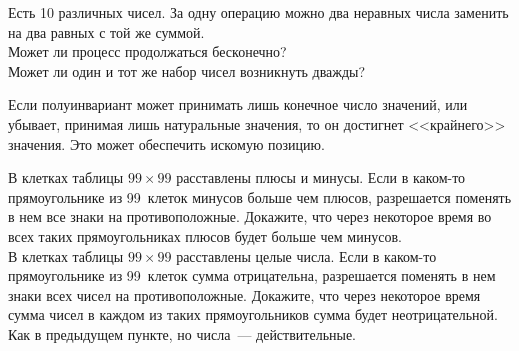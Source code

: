 \begin{problems}

\item
Есть 10 различных чисел.
За одну операцию можно два неравных числа заменить на два равных с той же
суммой.
\\
\sp
Может ли процесс продолжаться бесконечно?
\\
\sp
Может ли один и тот же набор чисел возникнуть дважды?

\end{problems}

Если полуинвариант может принимать лишь конечное число значений, или убывает,
принимая лишь натуральные значения, то он достигнет <<крайнего>> значения.
Это может обеспечить искомую позицию.

\begin{problems}

\item
\sp
В клетках таблицы $99 \times 99$ расставлены плюсы и минусы.
Если в каком-то прямоугольнике из 99~клеток минусов больше чем плюсов,
разрешается поменять в нем все знаки на противоположные.
Докажите, что через некоторое время во всех таких прямоугольниках плюсов будет
больше чем минусов.
\\
\sp
В клетках таблицы $99 \times 99$ расставлены целые числа.
Если в каком-то прямоугольнике из 99~клеток сумма отрицательна, разрешается
поменять в нем знаки всех чисел на противоположные.
Докажите, что через некоторое время сумма чисел в каждом из таких
прямоугольников сумма будет неотрицательной.
\\
\sp
Как в предыдущем пункте, но числа~--- действительные.

\end{problems}

